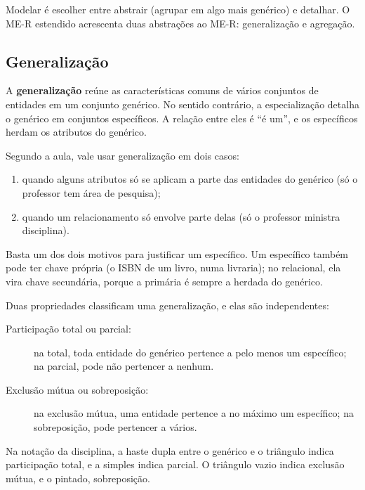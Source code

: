 Modelar é escolher entre abstrair (agrupar em algo mais genérico) e
detalhar. O ME-R estendido acrescenta duas abstrações ao ME-R:
generalização e agregação.

\subsection{Generalização}

A \textbf{generalização} reúne as características
comuns de vários conjuntos de entidades em um conjunto genérico. No
sentido contrário, a especialização detalha o genérico em conjuntos
específicos. A relação entre eles é ``é um'', e os específicos herdam os
atributos do genérico.

Segundo a aula, vale usar generalização em dois casos:

\begin{enumerate}
	\item quando alguns atributos só se aplicam a parte das entidades do
	genérico (só o professor tem área de pesquisa);
	\item quando um relacionamento só envolve parte delas (só o professor
	ministra disciplina).
\end{enumerate}

Basta um dos dois motivos para justificar um específico. Um específico
também pode ter chave própria (o ISBN de um livro, numa livraria); no
relacional, ela vira chave secundária, porque a primária é sempre a
herdada do genérico.

Duas propriedades classificam uma generalização, e elas são
independentes:

\begin{description}
	\item[Participação total ou parcial:] na total, toda entidade do
	genérico pertence a pelo menos um específico; na parcial, pode não
	pertencer a nenhum.
	\item[Exclusão mútua ou sobreposição:] na exclusão mútua, uma entidade
	pertence a no máximo um específico; na sobreposição, pode pertencer a
	vários.
\end{description}

Na notação da disciplina, a haste dupla entre o genérico e o triângulo
indica participação total, e a simples indica parcial. O triângulo vazio
indica exclusão mútua, e o pintado, sobreposição.

